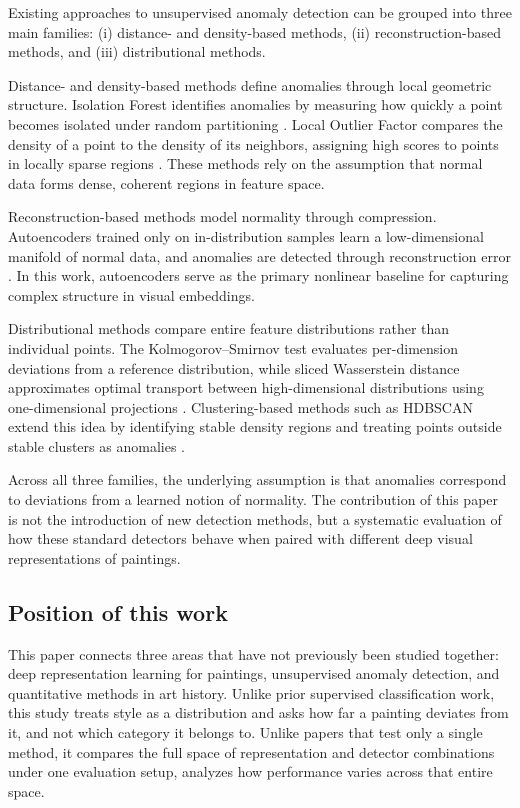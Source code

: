 \documentclass[conference]{IEEEtran}
\begin{document}
Existing approaches to unsupervised anomaly detection can be grouped into three main families: (i) distance- and density-based methods, (ii) reconstruction-based methods, and (iii) distributional methods.

Distance- and density-based methods define anomalies through local geometric structure. Isolation Forest identifies anomalies by measuring how quickly a point becomes isolated under random partitioning \cite{iforest}. Local Outlier Factor compares the density of a point to the density of its neighbors, assigning high scores to points in locally sparse regions \cite{lof}. These methods rely on the assumption that normal data forms dense, coherent regions in feature space.

Reconstruction-based methods model normality through compression. Autoencoders trained only on in-distribution samples learn a low-dimensional manifold of normal data, and anomalies are detected through reconstruction error \cite{aeanomaly}. In this work, autoencoders serve as the primary nonlinear baseline for capturing complex structure in visual embeddings.

Distributional methods compare entire feature distributions rather than individual points. The Kolmogorov--Smirnov test evaluates per-dimension deviations from a reference distribution, while sliced Wasserstein distance approximates optimal transport between high-dimensional distributions using one-dimensional projections \cite{swd}. Clustering-based methods such as HDBSCAN extend this idea by identifying stable density regions and treating points outside stable clusters as anomalies \cite{hdbscan}.

Across all three families, the underlying assumption is that anomalies correspond to deviations from a learned notion of normality. The contribution of this paper is not the introduction of new detection methods, but a systematic evaluation of how these standard detectors behave when paired with different deep visual representations of paintings.

\subsection{Position of this work}

This paper connects three areas that have not previously been studied together: deep representation learning for paintings, unsupervised anomaly detection, and quantitative methods in art history. Unlike prior supervised classification work, this study treats style as a distribution and asks how far a painting deviates from it, and not which category it belongs to. Unlike papers that test only a single method, it compares the full space of representation and detector combinations under one evaluation setup, analyzes how performance varies across that entire space.
\end{document}
